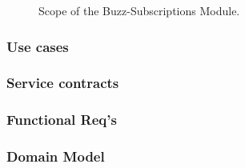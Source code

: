 \documentclass[12pt]{article}
\begin{document}
\begin{figure}[h]
\iffalse\texttt{[image: Diagrams/scopeSubscriptions.jpeg]}\fi
\caption{Scope of the Buzz-Subscriptions Module.}
\label{Use-case: Buzz-Subscriptions}
\end{figure}

\subsubsection{Use cases}
\subsubsection{Service contracts}
\subsubsection{Functional Req's}
\subsubsection{Domain Model}
\end{document}
